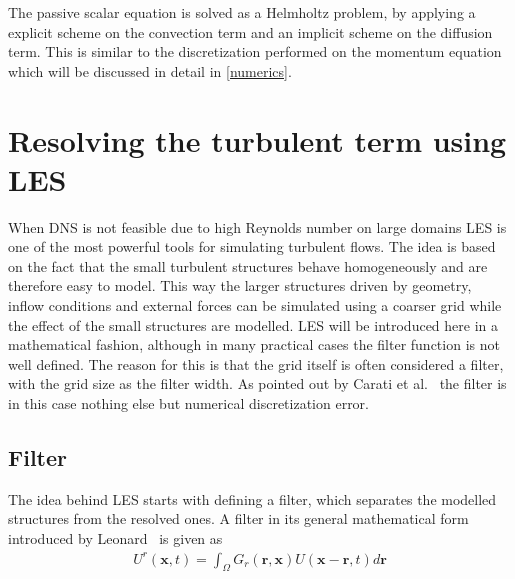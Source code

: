 The passive scalar equation is solved as a Helmholtz problem, by applying a explicit scheme on the convection term and an implicit 
scheme on the diffusion term. This is similar to the discretization performed on the momentum equation which will be discussed in 
detail in \cref{numerics}. 

\section{Resolving the turbulent term using LES} \label{LES}
When DNS is not feasible due to high Reynolds number on large domains LES is one of the most powerful tools for simulating turbulent flows.
The idea is based on the fact that the small turbulent structures behave homogeneously and are therefore easy to model.
This way the larger structures driven by geometry, inflow conditions and external forces can be simulated using a coarser 
grid while the effect of the small structures are modelled. 
LES will be introduced here in a mathematical fashion, although in many practical cases the filter function is not 
well defined. The reason for this is that the grid itself is often considered a filter, with the 
grid size as the filter width. As pointed out by Carati et al.~\cite{Carati} the filter is in this case nothing else but 
numerical discretization error. 

\subsection{Filter}
The idea behind LES starts with defining a filter, which separates the modelled structures from the resolved ones. 
A filter in its general mathematical form introduced by Leonard~\cite{Leonard} is given as 
\begin{align}
    U^r(\mathbf{x},t) = \int_{\Omega} G_r(\mathbf{r},\mathbf{x})U(\mathbf{x}-\mathbf{r},t)d\mathbf{r}
    \label{eq:filter}
\end{align}


 
